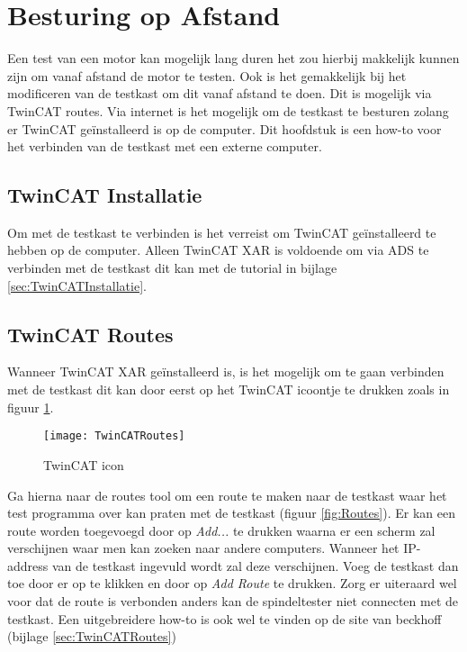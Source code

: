 \section{Besturing op Afstand}

Een test van een motor kan mogelijk lang duren het zou hierbij makkelijk kunnen zijn om vanaf afstand de motor te testen. Ook is het gemakkelijk bij het modificeren van de testkast om dit vanaf afstand te doen. Dit is mogelijk via \gls{TwinCAT} routes. Via internet is het mogelijk om de testkast te besturen zolang er \gls{TwinCAT} geïnstalleerd is op de computer. Dit hoofdstuk is een how-to voor het verbinden van de testkast met een externe computer.

\subsection{\gls{TwinCAT} Installatie}

Om met de testkast te verbinden is het verreist om TwinCAT geïnstalleerd te hebben op de computer. Alleen \gls{TwinCAT} XAR is voldoende om via \gls{ADS} te verbinden met de testkast dit kan met de tutorial in bijlage \ref{sec:TwinCATInstallatie}.

\subsection{\gls{TwinCAT} Routes}

Wanneer \gls{TwinCAT} XAR geïnstalleerd is, is het mogelijk om te gaan verbinden met de testkast dit kan door eerst op het \gls{TwinCAT} icoontje te drukken zoals in figuur \ref{fig:TwinCATIcon}.


\begin{figure}[H]
	\centering
	\texttt{[image: TwinCATRoutes]}
	\caption{\gls{TwinCAT} icon}
	\label{fig:TwinCATIcon}
\end{figure}

\newpage

Ga hierna naar de routes tool om een route te maken naar de testkast waar het test programma over kan praten met de testkast (figuur \ref{fig:Routes}). Er kan een route worden toegevoegd door op \textit{Add...} te drukken waarna er een scherm zal verschijnen waar men kan zoeken naar andere computers. Wanneer het IP-address van de testkast ingevuld wordt zal deze verschijnen. Voeg de testkast dan toe door er op te klikken en door op \textit{Add Route} te drukken. Zorg er uiteraard wel voor dat de route is verbonden anders kan de spindeltester niet connecten met de testkast. Een uitgebreidere how-to is ook wel te vinden op de site van beckhoff (bijlage \ref{sec:TwinCATRoutes})


